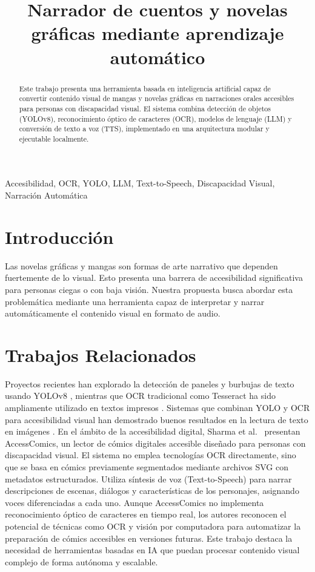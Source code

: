 \documentclass[conference]{IEEEtran}
\title{Narrador de cuentos y novelas gráficas mediante aprendizaje automático}
\author{\IEEEauthorblockN{Maverick Chacón, Marny López, Kendall Méndez}
\IEEEauthorblockA{Universidad CENFOTEC\\
Email: {mchacon, mlopez, kmendez}@ucenfotec.ac.cr}}
\begin{document}
\maketitle

\begin{abstract}
Este trabajo presenta una herramienta basada en inteligencia artificial capaz de convertir contenido visual de mangas y novelas gráficas en narraciones orales accesibles para personas con discapacidad visual. El sistema combina detección de objetos (YOLOv8), reconocimiento óptico de caracteres (OCR), modelos de lenguaje (LLM) y conversión de texto a voz (TTS), implementado en una arquitectura modular y ejecutable localmente.
\end{abstract}

\begin{IEEEkeywords}
Accesibilidad, OCR, YOLO, LLM, Text-to-Speech, Discapacidad Visual, Narración Automática
\end{IEEEkeywords}

\section{Introducción}
Las novelas gráficas y mangas son formas de arte narrativo que dependen fuertemente de lo visual. Esto presenta una barrera de accesibilidad significativa para personas ciegas o con baja visión. Nuestra propuesta busca abordar esta problemática mediante una herramienta capaz de interpretar y narrar automáticamente el contenido visual en formato de audio.

\section{Trabajos Relacionados}
Proyectos recientes han explorado la detección de paneles y burbujas de texto usando YOLOv8 \cite{yolov8comics}, mientras que OCR tradicional como Tesseract ha sido ampliamente utilizado en textos impresos \cite{smith2007tesseract}. Sistemas que combinan YOLO y OCR para accesibilidad visual han demostrado buenos resultados en la lectura de texto en imágenes \cite{patel2022ocrtts}.
En el ámbito de la accesibilidad digital, Sharma et al.\ \cite{sharma2021accesscomics} presentan AccessComics, un lector de cómics digitales accesible diseñado para personas con discapacidad visual. El sistema no emplea tecnologías OCR directamente, sino que se basa en cómics previamente segmentados mediante archivos SVG con metadatos estructurados. Utiliza síntesis de voz (Text-to-Speech) para narrar descripciones de escenas, diálogos y características de los personajes, asignando voces diferenciadas a cada uno. Aunque AccessComics no implementa reconocimiento óptico de caracteres en tiempo real, los autores reconocen el potencial de técnicas como OCR y visión por computadora para automatizar la preparación de cómics accesibles en versiones futuras. Este trabajo destaca la necesidad de herramientas basadas en IA que puedan procesar contenido visual complejo de forma autónoma y escalable.
\end{document}
